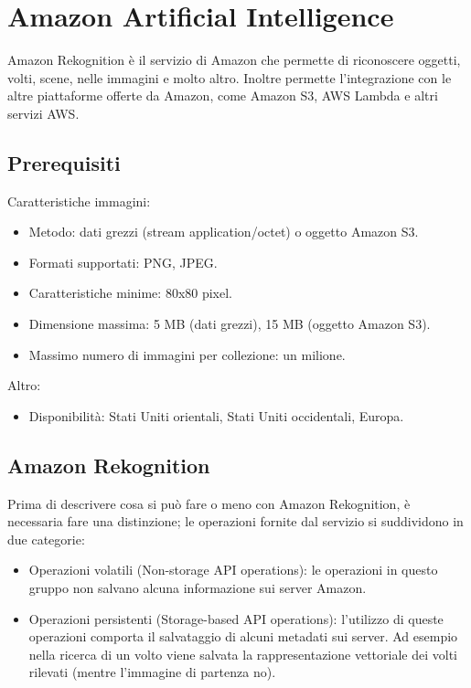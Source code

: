 \section{Amazon Artificial Intelligence}
Amazon Rekognition \cite{amazon-api} è il servizio di Amazon che permette di riconoscere oggetti, volti, scene, nelle immagini e molto altro.
Inoltre permette l'integrazione con le altre piattaforme offerte da Amazon, come Amazon S3, AWS Lambda e altri servizi AWS.

\subsection{Prerequisiti}
Caratteristiche immagini:
\begin{itemize}
\item Metodo: dati grezzi (stream application/octet) o oggetto Amazon S3.
\item Formati supportati: PNG, JPEG.
\item Caratteristiche minime: 80x80 pixel. 
\item Dimensione massima: 5 MB (dati grezzi), 15 MB (oggetto Amazon S3).
\item Massimo numero di immagini per collezione: un milione.
\end{itemize}
Altro:
\begin{itemize}
\item Disponibilità: Stati Uniti orientali, Stati Uniti occidentali, Europa.
\end{itemize}

\subsection{Amazon Rekognition}
Prima di descrivere cosa si può fare o meno con Amazon Rekognition, è necessaria fare una distinzione; le operazioni fornite dal servizio si suddividono in due categorie:
\begin{itemize}
\item Operazioni volatili (Non-storage API operations): le operazioni in questo gruppo non salvano alcuna informazione sui server Amazon.
\item Operazioni persistenti (Storage-based API operations): l'utilizzo di queste operazioni comporta il salvataggio di alcuni metadati sui server.
Ad esempio nella ricerca di un volto viene salvata la rappresentazione vettoriale dei volti rilevati (mentre l'immagine di partenza no).
\end{itemize}

